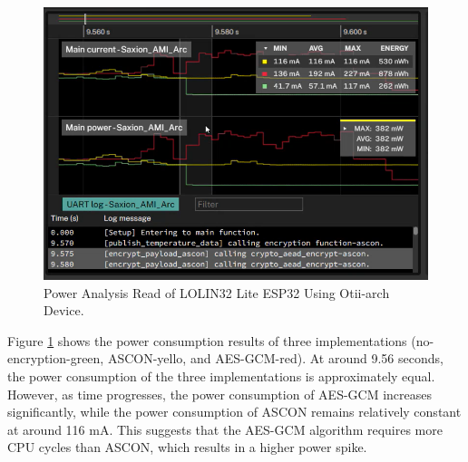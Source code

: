 \begin{figure}[H]
    \centering
    \includegraphics[width=0.9\linewidth]{images/fp/power-otti.png}
    \caption{Power Analysis Read of LOLIN32 Lite ESP32 Using Otii-arch Device.}
    \label{fig:otii-mon}
\end{figure}

Figure \ref{fig:otii-mon} shows the power consumption results of three implementations (no-encryption-green, ASCON-yello, and AES-GCM-red). At around 9.56 seconds, the power consumption of the three implementations is approximately equal. However, as time progresses, the power consumption of AES-GCM increases significantly, while the power consumption of ASCON remains relatively constant at around 116 mA. This suggests that the AES-GCM algorithm requires more CPU cycles than ASCON, which results in a higher power spike.

